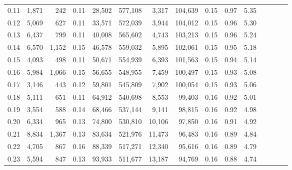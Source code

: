 \begin{tabular}{rrrcrrrrrrrrrrr}
0.11 &   1,871 &    242 &                                       0.11 &   28,502 &  577,108 &    3,317 &  104,639 &  0.15 &  0.97 &                         5.35 \\
0.12 &   5,069 &    627 &                                       0.11 &   33,571 &  572,039 &    3,944 &  104,012 &  0.15 &  0.96 &                         5.30 \\
0.13 &   6,437 &    799 &                                       0.11 &   40,008 &  565,602 &    4,743 &  103,213 &  0.15 &  0.96 &                         5.24 \\
0.14 &   6,570 &  1,152 &                                       0.15 &   46,578 &  559,032 &    5,895 &  102,061 &  0.15 &  0.95 &                         5.18 \\
0.15 &   4,093 &    498 &                                       0.11 &   50,671 &  554,939 &    6,393 &  101,563 &  0.15 &  0.94 &                         5.14 \\
0.16 &   5,984 &  1,066 &                                       0.15 &   56,655 &  548,955 &    7,459 &  100,497 &  0.15 &  0.93 &                         5.08 \\
0.17 &   3,146 &    443 &                                       0.12 &   59,801 &  545,809 &    7,902 &  100,054 &  0.15 &  0.93 &                         5.06 \\
0.18 &   5,111 &    651 &                                       0.11 &   64,912 &  540,698 &    8,553 &   99,403 &  0.16 &  0.92 &                         5.01 \\
0.19 &   3,554 &    588 &                                       0.14 &   68,466 &  537,144 &    9,141 &   98,815 &  0.16 &  0.92 &                         4.98 \\
0.20 &   6,334 &    965 &                                       0.13 &   74,800 &  530,810 &   10,106 &   97,850 &  0.16 &  0.91 &                         4.92 \\
0.21 &   8,834 &  1,367 &                                       0.13 &   83,634 &  521,976 &   11,473 &   96,483 &  0.16 &  0.89 &                         4.84 \\
0.22 &   4,705 &    867 &                                       0.16 &   88,339 &  517,271 &   12,340 &   95,616 &  0.16 &  0.89 &                         4.79 \\
0.23 &   5,594 &    847 &                                       0.13 &   93,933 &  511,677 &   13,187 &   94,769 &  0.16 &  0.88 &                         4.74 \\

\end{tabular}
